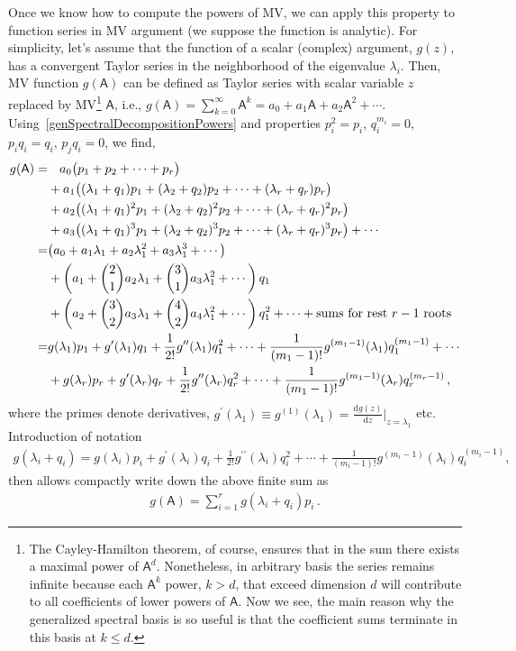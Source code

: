 \documentclass[AMA,STIX1COL]{WileyNJD-v2}
\def\m#1{\mathsf{#1}} %
\newcommand{\dd}{\mathrm{d}} %
\def\m#1{\mathsf{#1}}%
\begin{document}
Once we know how to compute the powers of MV, we can apply this property to function series in MV argument (we suppose the function is
analytic). For simplicity, let's  assume that the function of a scalar (complex) argument, $g(z)$, has a convergent Taylor series in the
neighborhood of the eigenvalue $\lambda_i$. Then, MV function  $g(\m{A})$ can be defined as Taylor series with  scalar variable $z$
replaced by MV\footnote{The Cayley-Hamilton theorem, of course, ensures that in the sum there exists a maximal power of $\m{A}^d$. Nonetheless,
in arbitrary basis the series remains infinite because each $\m{A}^k$ power, $k>d$, that exceed dimension $d$ will contribute to all
coefficients of lower powers of $\m{A}$. Now we see, the main reason why the generalized spectral basis is so useful is that the coefficient
sums terminate in this basis at $k\le d$.} $\m{A}$, i.e., $g(\m{A})=\sum_{k=0}^\infty \m{A}^k = a_0+ a_1 \m{A}+a_2\m{A}^2+\cdots$.
Using~\eqref{genSpectralDecompositionPowers} and properties $p_i^2=p_i$, $q_i^{m_i}=0$, $p_iq_i=q_i$, $p_j q_i=0$, we find,
\begin{align}\label{gTaylor}
  g(\m{A})=&\phantom{+}\,a_0\bigl( p_1+ p_2 +\cdots + p_r\bigr)\notag \\
  &+a_1\bigl((\lambda_1+q_1) p_1+ (\lambda_2+q_2)p_2 +\cdots + (\lambda_r+q_r)p_r\bigr)\notag \\
  &+a_2\bigl((\lambda_1+q_1)^2 p_1+ (\lambda_2+q_2)^2 p_2 +\cdots + (\lambda_r+q_r)^2 p_r\bigr)\notag \\
  &+a_3\bigl((\lambda_1+q_1)^3 p_1+ (\lambda_2+q_2)^3 p_2 +\cdots + (\lambda_r+q_r)^3 p_r\bigr)+\cdots\notag \\
  =&\bigl(a_0+a_1\lambda_1+a_2\lambda_1^2 + a_3\lambda_1^3+\cdots\bigr)\notag\\
  &+\left(a_1+\binom{2}{1}a_2\lambda_1+\binom{3}{1}a_3\lambda_1^2 +\cdots \right)q_1\notag\\
  &+\left(a_2+\binom{3}{2}a_3\lambda_1+\binom{4}{2}a_4\lambda_1^2 +\cdots \right)q_1^2+\cdots+\text{sums for rest $r-1$ roots}\\
  =&g(\lambda_1)p_1+ g^\prime(\lambda_1)q_1+ \frac{1}{2!}g^{\prime\prime}(\lambda_1)q_1^2+\cdots +
  \frac{1}{(m_1-1)!}g^{(m_1-1)}(\lambda_1)q_1^{(m_1-1)}+\cdots\notag\\
  &+g(\lambda_r)p_r+ g^\prime(\lambda_r)q_r+ \frac{1}{2!}g^{\prime\prime}(\lambda_r)q_r^2+\cdots +
  \frac{1}{(m_1-1)!}g^{(m_1-1)}(\lambda_r)q_r^{(m_r-1)}\, ,\notag
\end{align}
where the primes denote derivatives, $g^\prime(\lambda_1)\equiv g^{(1)}(\lambda_1)=\frac{\dd g(z)}{\dd z}\vert_{z=\lambda_1}$ etc.
Introduction of notation
\begin{align}\label{gNotation}
  g(\lambda_i+q_i)=g(\lambda_i)p_i+ g^\prime(\lambda_i)q_i+ \frac{1}{2!}g^{\prime\prime}(\lambda_i)q_i^2+\cdots +
  \frac{1}{(m_i-1)!}g^{(m_i-1)}(\lambda_i)q_i^{(m_i-1)},
\end{align}
then allows compactly write down the above finite sum as
\begin{align}\label{gTaylorFin}
  g(\m{A})=\sum_{i=1}^r g(\lambda_i+q_i)p_i \,.
\end{align}
\end{document}
